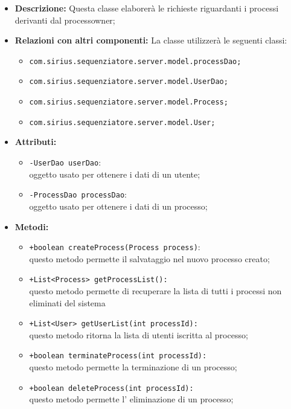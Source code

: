 \begin{itemize}
	\item \textbf{Descrizione: } Questa classe elaborerà le richieste riguardanti i processi derivanti dal processowner; 
	\item \textbf{Relazioni con altri componenti: }
	La classe utilizzerà le seguenti classi:
	\begin{itemize}
		\item \texttt{com.sirius.sequenziatore.server.model.processDao;}
		\item \texttt{com.sirius.sequenziatore.server.model.UserDao;}
		\item \texttt{com.sirius.sequenziatore.server.model.Process;}
		\item \texttt{com.sirius.sequenziatore.server.model.User;}
	\end{itemize}
	\item \textbf{Attributi:}\begin{itemize}
					\item \texttt{-UserDao userDao}:\\
					oggetto usato per ottenere i dati di un utente;
					\item \texttt{-ProcessDao processDao}:\\
					oggetto usato per ottenere i dati di un processo;
	\end{itemize}
	\item \textbf{Metodi: }\begin{itemize}
					\item \texttt{+boolean createProcess(Process process)}:\\
					questo metodo permette il salvataggio nel nuovo processo creato;
					\item \texttt{+List<Process> getProcessList():}\\
					questo metodo permette di recuperare la lista di tutti i processi non eliminati del sistema
					\item \texttt{+List<User> getUserList(int processId):}\\
					questo metodo ritorna la lista di utenti iscritta al processo;
					\item \texttt{+boolean terminateProcess(int processId):}\\
					questo metodo permette la terminazione di un processo;
					\item \texttt{+boolean deleteProcess(int processId):}\\
					questo metodo permette l' eliminazione di un processo;
				\end{itemize}
\end{itemize}
